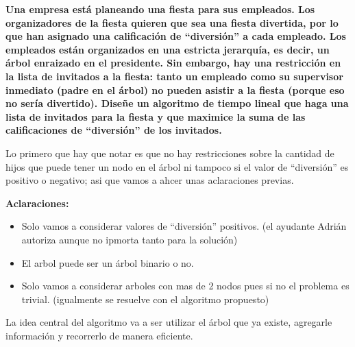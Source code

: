 \textbf{Una empresa est\'a planeando una fiesta para sus empleados. Los organizadores de la fiesta quieren que sea una fiesta divertida, por lo que han asignado una calificaci\'on de ``diversi\'on'' a cada empleado. Los empleados est\'an organizados en una estricta jerarqu\'ia, es decir, un \'arbol enraizado en el presidente. Sin embargo, hay una restricci\'on en la lista de invitados a la fiesta: tanto un empleado como su supervisor inmediato (padre en el \'arbol) no pueden asistir a la fiesta (porque eso no ser\'ia divertido). Dise\~ne un algoritmo de tiempo lineal que haga una lista de invitados para la fiesta y que maximice la suma de las calificaciones de ``diversi\'on'' de los invitados.}\vspace{.2cm}

Lo primero que hay que notar es que no hay restricciones sobre la cantidad de hijos que puede tener un nodo en el \'arbol ni tampoco si el valor de ``diversi\'on'' es positivo o negativo; asi que vamos a ahcer unas aclaraciones previas. \vspace{.2cm}

\textbf{Aclaraciones:}
\begin{itemize}
    \item Solo vamos a considerar valores de ``diversi\'on'' positivos. (el ayudante Adri\'an autoriza aunque no ipmorta tanto para la soluci\'on)
    \item El arbol puede ser un \'arbol binario o no.
    \item Solo vamos a considerar arboles con mas de 2 nodos pues si no el problema es trivial. (igualmente se resuelve con el algoritmo propuesto)
\end{itemize}

La idea central del algoritmo va a ser utilizar el árbol que ya existe, agregarle información y recorrerlo de manera eficiente. \vspace{.2cm}

